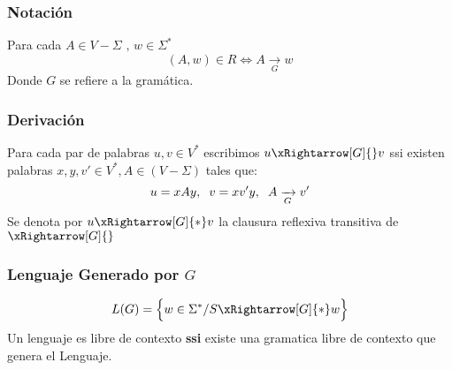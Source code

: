 \subsubsection{Notación}
Para cada $A\in V-\Sigma \text{ , } w\in\Sigma^*$
$$
(A,w)\in R \Leftrightarrow A \xrightarrow[G]{} w
$$
Donde $G$ se refiere a la gramática.
\subsubsection{Derivación}
Para cada par de palabras $u,v \in V^*$ escribimos $u \xRightarrow[G]{} v$ ssi existen palabras $x,y,v' \in V^*,A\in(V-\Sigma)$ tales que:
$$
u = xAy ,\hspace{0.2cm} v = xv' y ,\hspace{0.2cm} A \xrightarrow[G]{} v'
$$
Se denota por $u \xRightarrow[G]{*} v$ la clausura reflexiva transitiva de $\xRightarrow[G]{}$
\subsubsection{Lenguaje Generado por $G$}
$$
L(G) = \Big\{ w\in \Sigma^* / S \xRightarrow[G]{*} w \Big\} 
$$
Un lenguaje es libre de contexto \textbf{ssi} existe una gramatica libre de contexto que genera el Lenguaje.
